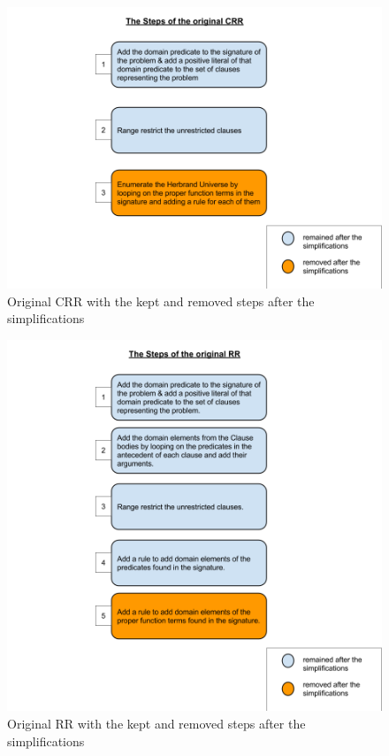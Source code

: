 			\begin{figure}[H]
				\centering
				\includegraphics[scale=0.42]{pictures/crr_before_and_after.png}
				\caption{Original CRR with the kept and removed steps after the simplifications\label{fig:crr_b_and_a}}
			\end{figure}					  	

			\begin{figure}[H]
				\centering
				\includegraphics[scale=0.42]{pictures/rr_before_and_after.png}
				\caption{Original RR with the kept and removed steps after the simplifications\label{fig:rr_b_and_a}}
			\end{figure}
			

